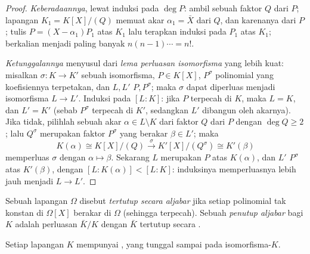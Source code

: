 \begin{proof}
\emph{Keberadaannya}, lewat induksi pada $\deg P$: ambil sebuah faktor
 $Q$ dari $P$; lapangan $K_1 = K[X]/(Q)$ memuat akar
$\alpha_1 = \bar X$ dari $Q$, dan karenanya dari $P$; tulis $P = (X -
\alpha_1)P_1$ atas $K_1$ lalu terapkan induksi pada $P_1$ atas $K_1$;
 berkalian menjadi paling banyak $n(n-1)\cdots = n!$.

\emph{Ketunggalannya} menyusul dari \emph{lema perluasan isomorfisma}
yang lebih kuat: misalkan $\sigma \colon K \to K'$ sebuah isomorfisma,
$P \in K[X]$, $P^\sigma$ polinomial yang koefisiennya terpetakan,
dan $L, L'$  $P, P^\sigma$; maka $\sigma$ dapat diperluas
menjadi isomorfisma $L \to L'$. Induksi pada $[L:K]$: jika $P$ terpecah
di $K$, maka $L = K$, dan $L' = K'$ (sebab $P^\sigma$ terpecah di $K'$,
sedangkan $L'$ dibangun oleh akarnya). Jika tidak, pilihlah sebuah akar
$\alpha \in L \setminus K$ dari faktor  $Q$ dari $P$
dengan $\deg Q \geq 2$; lalu $Q^\sigma$ merupakan faktor 
$P^\sigma$ yang berakar $\beta \in L'$; maka
\[
K(\alpha) \cong K[X]/(Q) \xrightarrow{\ \sigma\ }
K'[X]/(Q^\sigma) \cong K'(\beta)
\]
memperluas $\sigma$ dengan $\alpha \mapsto \beta$. Sekarang $L$ merupakan
 $P$ atas $K(\alpha)$, dan $L'$  $P^\sigma$
atas $K'(\beta)$, dengan $[L : K(\alpha)] < [L:K]$: induksinya
memperluasnya lebih jauh menjadi $L \to L'$.
\end{proof}

\begin{definition}\label{def:b3:galois:closure}
Sebuah lapangan $\Omega$ disebut \emph{tertutup secara aljabar} jika setiap polinomial tak konstan di $\Omega[X]$
berakar di $\Omega$ (sehingga terpecah). Sebuah \emph{penutup
aljabar} bagi $K$ adalah perluasan
 $\bar K/K$ dengan $\bar K$ tertutup secara .
\end{definition}

\begin{theorem}[Steinitz]\label{thm:b3:galois:steinitz}
Setiap lapangan $K$ mempunyai , yang tunggal sampai pada
isomorfisma-$K$.
\end{theorem}

